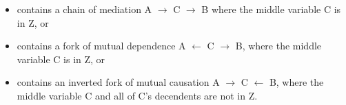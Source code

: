 \begin{itemize}

\item contains a chain of mediation A $\rightarrow$ C $\rightarrow$  B where the middle variable C is in Z, or

\item contains a fork of mutual dependence A $\leftarrow$ C $\rightarrow$ B, where the middle variable C is in Z, or

\item contains an inverted fork of mutual causation A $\rightarrow$ C $\leftarrow$  B, where the middle variable C and all of C's decendents are not in Z.

\end{itemize}

\nocite{Morgan.2014}
\nocite{Pearl.2009}






